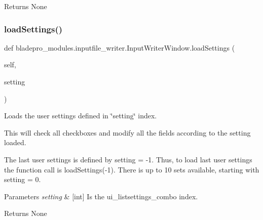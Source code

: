 \begin{DoxyReturn}{Returns}
None 
\end{DoxyReturn}
\hypertarget{classbladepro__modules_1_1inputfile__writer_1_1_input_writer_window_a0c4f30850537553db0ff2e27059733a4}{}\label{classbladepro__modules_1_1inputfile__writer_1_1_input_writer_window_a0c4f30850537553db0ff2e27059733a4} 
\subsubsection{\texorpdfstring{load\+Settings()}{loadSettings()}}
{\footnotesize\ttfamily def bladepro\+\_\+modules.\+inputfile\+\_\+writer.\+Input\+Writer\+Window.\+load\+Settings (\begin{DoxyParamCaption}\item[{}]{self,  }\item[{}]{setting }\end{DoxyParamCaption})}



Loads the user settings defined in \char`\"{}setting\char`\"{} index. 

This will check all checkboxes and modify all the fields according to the setting loaded.

The last user settings is defined by setting = -\/1. Thus, to load last user settings the function call is load\+Settings(-\/1). There is up to 10 sets available, starting with setting = 0.


\begin{DoxyParams}{Parameters}
{\em setting} & \mbox{[}int\mbox{]} Is the ui\+\_\+listsettings\+\_\+combo index. \\
\hline
\end{DoxyParams}
\begin{DoxyReturn}{Returns}
None 
\end{DoxyReturn}
\hypertarget{classbladepro__modules_1_1inputfile__writer_1_1_input_writer_window_ad94f49b4827a3ea0b56070e0149ae2aa}{}\label{classbladepro__modules_1_1inputfile__writer_1_1_input_writer_window_ad94f49b4827a3ea0b56070e0149ae2aa} 
